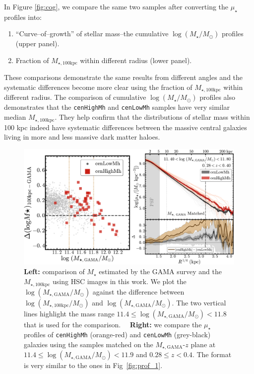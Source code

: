 \documentclass[a4paper,fleqn,usenatbib]{mnras}
\def\rbcg{\texttt{cenHighMh}}
\def\nbcg{\texttt{cenLowMh}}
\def\mstar{{$M_{\star}$}}
\def\logms{{$\log (M_{\star}/M_{\odot})$}}
\def\mtot{{$M_{\star,100\mathrm{kpc}}$}}
\def\mgama{{$M_{\star,\mathrm{GAMA}}$}}
\def\logmtot{{$\log (M_{\star,100\mathrm{kpc}}/M_{\odot})$}}
\def\logmgama{{$\log (M_{\star,\mathrm{GAMA}}/M_{\odot})$}}
\def\mden{{$\mu_{\star}$}}
\begin{document}
	In Figure \ref{fig:cog}, we compare the same two samples after converting the 
	\mden{} profiles into: 
	
	\begin{enumerate}
	
	    \item ``Curve--of--growth'' of stellar mass--the cumulative \logms{} profiles
	        (upper panel).
	    
	    \item Fraction of \mtot{} within different radius (lower panel).
	
	\end{enumerate}
	
	These comparisons demonstrate the same results from different angles and 
	the systematic differences become more clear using the fraction of \mtot{}
	within different radius.  
	The comparison of cumulative \logms{} profiles also demonstrates that the 
	\rbcg{} and \nbcg{} samples have very similar median \mtot{}.  
    They help confirm that the distributions of stellar mass within 100 kpc indeed 
    have systematic differences between the massive central galaxies living in more 
    and less massive dark matter haloes. 


\begin{figure}
    \centering
    \includegraphics[width=16cm]{fig/redbcg_prof_gama_new}
    \caption{
        \textbf{Left:} comparison of \mstar{} estimated by the GAMA survey and 
        the \mtot{} using HSC images in this work. 
        We plot the \logmgama{} against the difference between \logmtot{} and \logmgama{}. 
        The two vertical lines highlight the mass range $11.4 \leq$\logmgama{}$<11.8$ 
        that is used for the comparison.~~
        \textbf{Right:} we compare the \mden{} profiles of \rbcg{} (orange-red) and 
        \nbcg{} (grey-black) galaxies using the samples matched on the 
        \mgama{}-$z$ plane at $11.4 \leq$\logmgama{}$<11.9$ and $0.28 \leq z < 0.4$. 
        The format is very similar to the ones in Fig~\ref{fig:prof_1}.}
    \label{fig:gama}
\end{figure}
\end{document}
